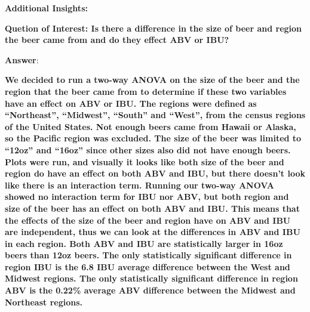 \documentclass[
]{article}
\begin{document}
\textbf{Additional Insights:}

\textbf{Quetion of Interest: Is there a difference in the size of beer
and region the beer came from and do they effect ABV or IBU?}

\textbf{Answer}:

\textbf{We decided to run a two-way ANOVA on the size of the beer and
the region that the beer came from to determine if these two variables
have an effect on ABV or IBU. The regions were defined as ``Northeast'',
``Midwest'', ``South'' and ``West'', from the census regions of the
United States. Not enough beers came from Hawaii or Alaska, so the
Pacific region was excluded. The size of the beer was limited to
``12oz'' and ``16oz'' since other sizes also did not have enough beers.
Plots were run, and visually it looks like both size of the beer and
region do have an effect on both ABV and IBU, but there doesn't look
like there is an interaction term. Running our two-way ANOVA showed no
interaction term for IBU nor ABV, but both region and size of the beer
has an effect on both ABV and IBU. This means that the effects of the
size of the beer and region have on ABV and IBU are independent, thus we
can look at the differences in ABV and IBU in each region. Both ABV and
IBU are statistically larger in 16oz beers than 12oz beers. The only
statistically significant difference in region IBU is the 6.8 IBU
average difference between the West and Midwest regions. The only
statistically significant difference in region ABV is the 0.22\% average
ABV difference between the Midwest and Northeast regions.}
\end{document}
